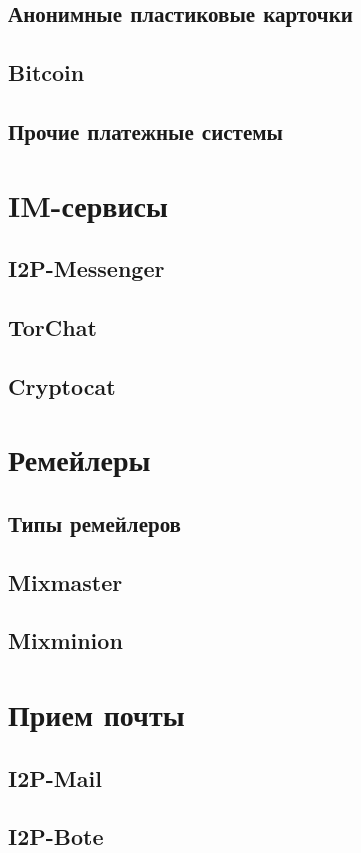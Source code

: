 \subsection{Анонимные пластиковые карточки}
\subsection{Bitcoin}
\subsection{Прочие платежные системы}

\section{IM-сервисы}
\subsection{I2P-Messenger}
\subsection{TorChat}
\subsection{Cryptocat}

\section{Ремейлеры}
\subsection{Типы ремейлеров}
\subsection{Mixmaster}
\subsection{Mixminion}

\section{Прием почты}
\subsection{I2P-Mail}
\subsection{I2P-Bote}
